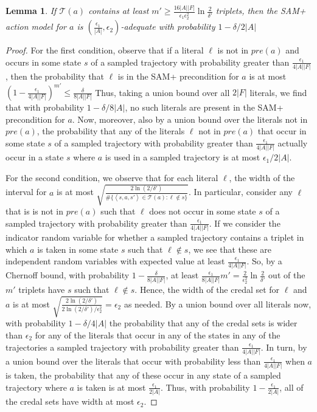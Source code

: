 \documentclass[letterpaper]{article} %
\newtheorem{lemma}{Lemma}
\newcommand{\pre}{\textit{pre}}
\newcommand{\tuple}[1]{\ensuremath{\left \langle #1 \right \rangle }}
\begin{document}
\begin{lemma}\label{lem:sam-adequate}
If $\mathcal{T}(a)$ contains at least
$
m' \geq \frac{16|A||F|}{\epsilon_1\epsilon_2^2}\ln\frac{2}{\delta'}
$
triplets, then the SAM+ action model for $a$ is
$(\frac{\epsilon_1}{|A|},\epsilon_2)$-adequate with probability $1-\delta/2|A|$
\end{lemma}
\begin{proof}
For the first condition, observe that if a literal $\ell$ is not in $\pre(a)$ and occurs in some state $s$ of a sampled trajectory with probability greater than $\frac{\epsilon_1}{4|A||F|}$, then the probability that $\ell$ is in the SAM+ precondition for $a$ is at most
$
(1-\frac{\epsilon_1}{4|A||F|})^{m'}\leq \frac{\delta}{8|A||F|}
$
Thus, taking a union bound over all $2|F|$ literals, we find that with probability $1-\delta/8|A|$, no such literals are present in the SAM+ precondition for $a$. Now, moreover, also by a union bound over the literals not in $\pre(a)$, the probability that any of the literals $\ell$ not in $\pre(a)$ that occur in some state $s$ of a sampled trajectory with probability greater than $\frac{\epsilon_1}{4|A||F|}$ actually occur in a state $s$ where $a$ is used in a sampled trajectory is at most $\epsilon_1/2|A|$.

For the second condition, we observe that for each literal $\ell$, the width of the interval for $a$ is at most $\sqrt{\frac{2\ln(2/\delta')}{\#\{\tuple{s, a, s'}\in \mathcal{T}(a):\ell\notin s\}}}$. In particular, consider any $\ell$ that is is not in $\pre(a)$ such that $\ell$ does not occur in some state $s$ of a sampled trajectory with probability greater than $\frac{\epsilon_1}{4|A||F|}$. If we consider the indicator random variable for whether a sampled trajectory contains a triplet in which $a$ is taken in some state $s$ such that $\ell\notin s$, we see that these are independent random variables with expected value at least $\frac{\epsilon_1}{4|A||F|}$. So, by a Chernoff bound, with probability $1-\frac{\delta}{8|A||F|}$, at least $\frac{\epsilon_1}{8|A||F|}m'=\frac{2}{\epsilon_2^2}\ln\frac{2}{\delta'}$ out of the $m'$ triplets have $s$ such that $\ell\notin s$. Hence, the width of the credal set for $\ell$ and $a$ is at most
$
\sqrt{\frac{2\ln(2/\delta')}{2\ln(2/\delta')/\epsilon_2^2}}=\epsilon_2
$
as needed. By a union bound over all literals now, with probability $1-\delta/4|A|$ the probability that any of the credal sets is wider than $\epsilon_2$ for any of the literals that occur in any of the states in any of the trajectories a sampled trajectory with probability greater than $\frac{\epsilon_1}{4|A||F|}$. In turn, by a union bound over the literals that occur with probability less than $\frac{\epsilon_1}{4|A||F|}$ when $a$ is taken, the probability that any of these occur in any state of a sampled trajectory where $a$ is taken is at most $\frac{\epsilon_1}{2|A|}$. Thus, with probability $1-\frac{\epsilon_1}{2|A|}$, all of the credal sets have width at most $\epsilon_2$.


\end{proof}
\end{document}
